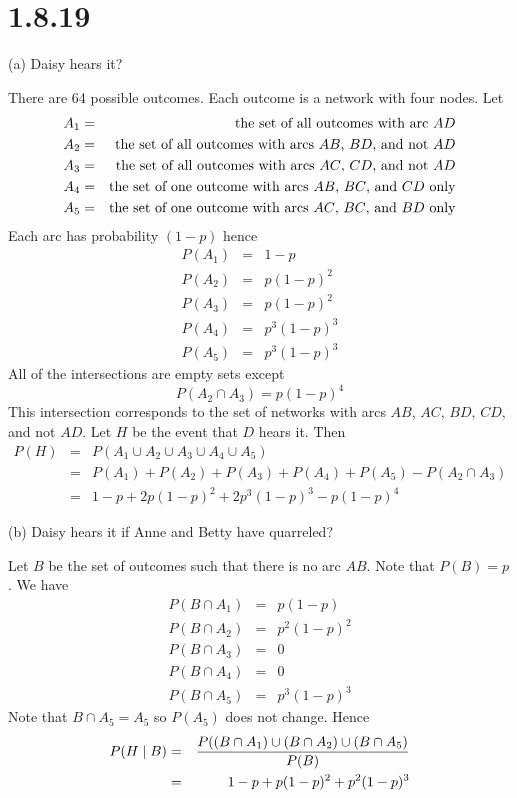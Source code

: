 \section*{1.8.19}
(a) Daisy hears it?

\bigskip
\noindent
There are 64 possible outcomes.
Each outcome is a network with four nodes.
Let
\begin{eqnarray*}
A_1&=&\hbox{the set of all outcomes with arc $AD$} \\
A_2&=&\hbox{the set of all outcomes with arcs $AB$, $BD$, and not $AD$} \\
A_3&=&\hbox{the set of all outcomes with arcs $AC$, $CD$, and not $AD$} \\
A_4&=&\hbox{the set of one outcome with arcs $AB$, $BC$, and $CD$ only} \\
A_5&=&\hbox{the set of one outcome with arcs $AC$, $BC$, and $BD$ only}
\end{eqnarray*}
Each arc has probability $(1-p)$ hence
\begin{eqnarray*}
P(A_1)&=&1-p \\
P(A_2)&=&p(1-p)^2 \\
P(A_3)&=&p(1-p)^2 \\
P(A_4)&=&p^3(1-p)^3 \\
P(A_5)&=&p^3(1-p)^3
\end{eqnarray*}
All of the intersections are empty sets except
$$P(A_2\cap A_3)=p(1-p)^4$$
This intersection corresponds to the set of networks
with arcs $AB$, $AC$, $BD$, $CD$, and not $AD$.
Let $H$ be the event that $D$ hears it.
Then
\begin{eqnarray*}
P(H)&=&P(A_1\cup A_2\cup A_3\cup A_4\cup A_5) \\
&=&P(A_1)+P(A_2)+P(A_3)+P(A_4)+P(A_5)-P(A_2\cap A_3) \\
&=&1-p+2p(1-p)^2+2p^3(1-p)^3-p(1-p)^4
\end{eqnarray*}

\bigskip
\noindent
(b) Daisy hears it if Anne and Betty have quarreled?

\bigskip
\noindent
Let $B$ be the set of outcomes such that there is no arc $AB$.
Note that $P(B)=p$.
We have
\begin{eqnarray*}
P(B\cap A_1)&=&p(1-p) \\
P(B\cap A_2)&=&p^2(1-p)^2 \\
P(B\cap A_3)&=&0 \\
P(B\cap A_4)&=&0 \\
P(B\cap A_5)&=&p^3(1-p)^3
\end{eqnarray*}
Note that $B\cap A_5=A_5$ so $P(A_5)$ does not change.
Hence
\begin{eqnarray*}
P(H\mid B)&=&{P(
(B\cap A_1)\cup
(B\cap A_2)\cup
(B\cap A_5)
\over P(B)} \\
&=&1-p+p(1-p)^2+p^2(1-p)^3
\end{eqnarray*}

